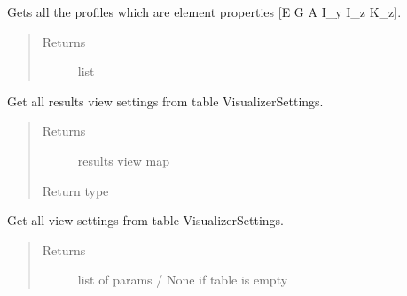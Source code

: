 \documentclass[letterpaper,10pt,english]{sphinxmanual}
\begin{document}
\begin{fulllineitems}
\begin{fulllineitems}
\begin{quote}
\begin{description}
\end{description}\end{quote}

\end{fulllineitems}


\begin{fulllineitems}
\label{\detokenize{api:beamon.database.Database.get_profiles}}
Gets all the profiles which are element properties {[}E G A I\_y I\_z K\_z{]}.
\begin{quote}\begin{description}
\item[{Returns}] \leavevmode
list

\end{description}\end{quote}

\end{fulllineitems}


\begin{fulllineitems}
\label{\detokenize{api:beamon.database.Database.get_results_view_settings}}
Get all results view settings from table VisualizerSettings.
\begin{quote}\begin{description}
\item[{Returns}] \leavevmode
results view map

\item[{Return type}] \leavevmode
{}

\end{description}\end{quote}

\end{fulllineitems}


\begin{fulllineitems}
\label{\detokenize{api:beamon.database.Database.get_view_settings}}
Get all view settings from table VisualizerSettings.
\begin{quote}\begin{description}
\item[{Returns}] \leavevmode
list of params / None if table is empty


\end{description}
\end{quote}
\end{fulllineitems}
\end{fulllineitems}
\end{document}
